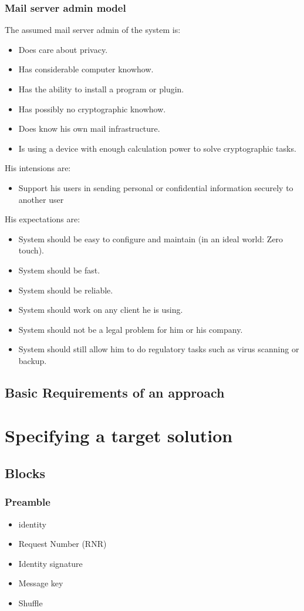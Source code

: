\subsection{Mail server admin model}
The assumed mail server admin of the system is:
\begin{itemize}
\item Does care about privacy.
\item Has considerable computer knowhow.
\item Has the ability to install a program or plugin.
\item Has possibly no cryptographic knowhow.
\item Does know his own mail infrastructure.
\item Is using a device with enough calculation power to solve cryptographic tasks.
\end{itemize}
His intensions are:
\begin{itemize}
\item Support his users in sending personal or confidential information securely to another user
\end{itemize}
His expectations are:
\begin{itemize}
\item System should be easy to configure and maintain (in an ideal world: Zero touch). 
\item System should be fast.
\item System should be reliable.
\item System should work on any client he is using.
\item System should not be a legal problem for him or his company.
\item System should still allow him to do regulatory tasks such as virus scanning or backup.
\end{itemize}

\section{Basic Requirements of an approach}

\chapter{Specifying a target solution}
\section{Blocks}
\subsection{Preamble}
\begin{itemize}
  \item identity
  \item Request Number (RNR)
  \item Identity signature
  \item Message key
  \item Shuffle
\end{itemize}

